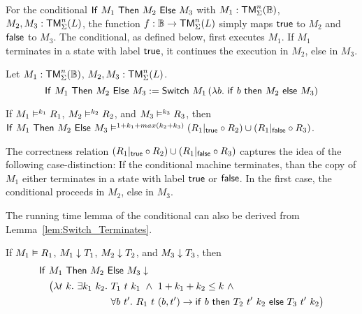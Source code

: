For the conditional $\mathsf{If}~M_1~\mathsf{Then}~M_2~\mathsf{Else}~M_3$ with $M_1 : \mathsf{TM}_\Sigma^n(\mathbb{B})$, $M_2, M_3 : \mathsf{TM}_\Sigma^n(L)$, the function $f : \mathbb{B} \rightarrow \mathsf{TM}_\Sigma^n(L)$
simply maps $\mathsf{true}$ to $M_2$ and $\mathsf{false}$ to $M_3$.  The conditional, as defined below, first executes $M_1$.  If $M_1$ terminates in a state with
label $\mathsf{true}$, it continues the execution in $M_2$, else in $M_3$.

%
\begin{definition}[Conditional][If]
  \label{def:If}
  Let $M_1 : \mathsf{TM}_\Sigma^n(\mathbb{B})$, $M_2, M_3 : \mathsf{TM}_\Sigma^n(L)$.
  \[
    \mathsf{If}~M_1~\mathsf{Then}~M_2~\mathsf{Else}~M_3 := \mathsf{Switch}~M_1
    \left(\lambda b.~\mathsf{if}~b~\mathsf{then}~M_2~\mathsf{else}~M_3 \right)
  \]
\end{definition}

\begin{lemma}
  \label{lem:If_RealiseIn}
  If $M_1 \mathrel{\vDash^{k_1}} R_1$, $M_2 \mathrel{\vDash^{k_2}} R_2$, and $M_3 \mathrel{\vDash^{k_3}} R_3$, then
  $\mathsf{If}~M_1~\mathsf{Then}~M_2~\mathsf{Else}~M_3 \mathrel{\vDash^{1+k_1+max(k_2+k_3)}} (R_1{|}_{\mathsf{true}} \circ R_2) \cup (R_1{|}_{\mathsf{false}} \circ R_3)$.
\end{lemma}

The correctness relation $(R_1{|}_{\mathsf{true}} \circ R_2) \cup (R_1{|}_{\mathsf{false}} \circ R_3)$ captures the idea of the following case-distinction: If the
conditional machine terminates, than the copy of $M_1$ either terminates in a state with label $\mathsf{true}$ or $\mathsf{false}$.  In the first case, the
conditional proceeds in $M_2$, else in $M_3$.

The running time lemma of the conditional can also be derived from Lemma~\ref{lem:Switch_Terminates}.
\begin{lemma}
  \label{lem:If_TerminatesIn}
  If $M_1 \mathrel{\vDash} R_1$, $M_1 \mathrel{\downarrow} T_1$, $M_2 \mathrel{\downarrow} T_2$, and $M_3 \mathrel{\downarrow} T_3$, then
  \begin{align*}
    & \mathsf{If}~M_1~\mathsf{Then}~M_2~\mathsf{Else}~M_3 \mathrel{\downarrow} \\
    &\quad \bigl( \lambda t~k.~\exists k_1~k_2.~T_1~t~k_1 ~\land~ 1+k_1+k_2 \leq k ~\land~ \\
    &\quad \phantom{\bigl( \lambda t~k.~\exists k_1~k_2.}~\forall b~t'.~R_1~t~(b, t') \rightarrow \mathsf{if}~b~\mathsf{then}~T_2~t'~k_2~\mathsf{else}~T_3~t'~k_2 \bigr)
  \end{align*}
\end{lemma}


